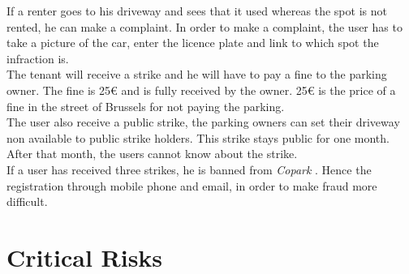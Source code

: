 \documentclass[12pt,a4paper,oneside]{book}
\newcommand{\bp}{\textit{Copark }}
\begin{document}
If a renter goes to his driveway and sees that it used whereas the spot is not rented, he can make a complaint. In order to make a complaint, the user has to take a picture of the car, enter the licence plate and link to which spot the infraction is.\\
The tenant will receive a strike and he will have to pay a fine to the parking owner. The fine is 25\euro{} and is fully received by the owner. 25\euro{} is the price of a fine in the street of Brussels for not paying the parking.\\
The user also receive a public strike, the parking owners can set their driveway non available to public strike holders. This strike stays public for one month. After that month, the users cannot know about the strike.\\
If a user has received three strikes, he is banned from \bp. Hence the registration through mobile phone and email, in order to make fraud more difficult.

\chapter{Critical Risks}
\end{document}
